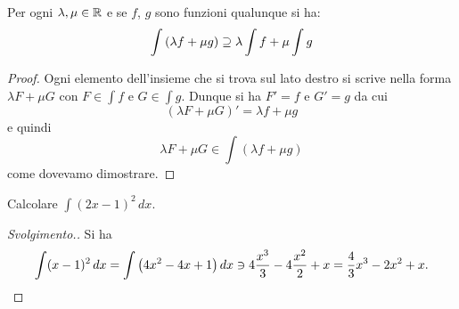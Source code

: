 \begin{theorem}
Per ogni $\lambda,\mu \in {\mathbb R}$ e se $f$, $g$ sono funzioni qualunque si ha:
\[
  \int {\left( \lambda f + \mu g \right)} \supseteq \lambda \int f + \mu \int g
\]
\end{theorem}
%
\begin{proof}
Ogni elemento dell'insieme che si trova sul lato destro
si scrive nella forma $\lambda F + \mu G$ con $F\in \int f$ e $G\in \int g$.
Dunque si ha $F'=f$ e $G'=g$ da cui
\[
  (\lambda F + \mu G)' = \lambda f + \mu g
\]
e quindi
\[
  \lambda F + \mu G \in \int (\lambda f + \mu g)
\]
come dovevamo dimostrare.
\end{proof}

\begin{example}\label{ex:234045}
  Calcolare $\int (2x-1)^2\, dx$.
\end{example}
\begin{proof}[Svolgimento.]
  Si ha 
  \[
  \int (x-1)^2\, dx = \int {\left( 4x^2 - 4x +1 \right)}\, dx 
  \ni 4\frac{x^3}{3} - 4 \frac {x^2}{2} + x
  = \frac 4 3 x^3 - 2 x^2 + x.
  \]
\end{proof}

